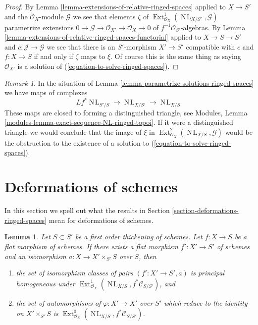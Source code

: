 \documentclass{stacks-project}
\theoremstyle{plain}
\newtheorem{lemma}[subsection]{Lemma}
\theoremstyle{definition}
\theoremstyle{remark}
\newtheorem{remark}[subsection]{Remark}
\numberwithin{equation}{subsection}
\def\Ext{\mathop{\mathrm{Ext}}\nolimits}
\def\NL{\mathop{N\!L}\nolimits}
\begin{document}
\begin{proof}
By Lemma \ref{lemma-extensions-of-relative-ringed-spaces}
applied to $X \to S'$ and the $\mathcal{O}_X$-module $\mathcal{G}$
we see that elements $\zeta$ of
$\Ext^1_{\mathcal{O}_X}(\NL_{X/S'}, \mathcal{G})$
parametrize extensions
$0 \to \mathcal{G} \to \mathcal{O}_{X'} \to \mathcal{O}_X \to 0$
of $f^{-1}\mathcal{O}_{S'}$-algebras. By
Lemma \ref{lemma-extensions-of-relative-ringed-spaces-functorial} applied
to $X \to S \to S'$ and $c : \mathcal{J} \to \mathcal{G}$
we see that there is an $S'$-morphism
$X' \to S'$ compatible with $c$ and $f : X \to S$ if and only if
$\zeta$ maps to $\xi$. Of course this is the same thing as saying
$\mathcal{O}_{X'}$ is a
solution of (\ref{equation-to-solve-ringed-spaces}).
\end{proof}

\begin{remark}
\label{remark-parametrize-solutions-ringed-spaces}
In the situation of
Lemma \ref{lemma-parametrize-solutions-ringed-spaces}
we have maps of complexes
$$
Lf^*\NL_{S'/S} \to \NL_{X/S'} \to \NL_{X/S}
$$
These maps are closed to forming a distinguished triangle, see
Modules, Lemma \ref{modules-lemma-exact-sequence-NL-ringed-topoi}.
If it were a distinguished triangle we would conclude
that the image of $\xi$ in $\Ext^2_{\mathcal{O}_X}(\NL_{X/S}, \mathcal{G})$
would be the obstruction to the existence of a solution to
(\ref{equation-to-solve-ringed-spaces}).
\end{remark}













\section{Deformations of schemes}
\label{section-deformations-schemes}

\noindent
In this section we spell out what the results in
Section \ref{section-deformations-ringed-spaces}
mean for deformations of schemes.

\begin{lemma}
\label{lemma-deform}
Let $S \subset S'$ be a first order thickening of schemes.
Let $f : X \to S$ be a flat morphism of schemes.
If there exists a flat morphism $f' : X' \to S'$ of schemes
and an isomorphism $a : X \to X' \times_{S'} S$ over $S$, then
\begin{enumerate}
\item the set of isomorphism classes of pairs $(f' : X' \to S', a)$ is
principal homogeneous under
$\Ext^1_{\mathcal{O}_X}(\NL_{X/S}, f^*\mathcal{C}_{S/S'})$, and
\item the set of automorphisms of $\varphi : X' \to X'$
over $S'$ which reduce to the identity on $X' \times_{S'} S$
is $\Ext^0_{\mathcal{O}_X}(\NL_{X/S}, f^*\mathcal{C}_{S/S'})$.
\end{enumerate}
\end{lemma}
\end{document}
